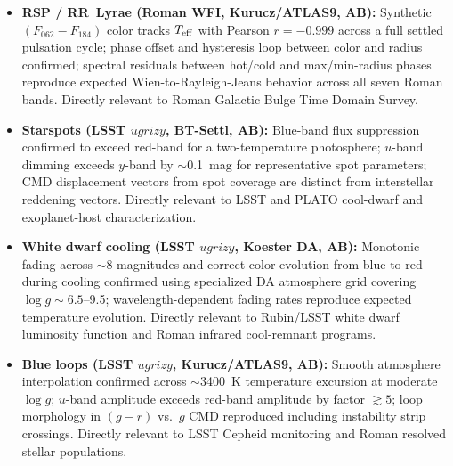 \documentclass[linenumbers,apj,twocolumn, floatfix]{aastex701}
\begin{document}
\begin{itemize}
    \item \textbf{RSP / RR~Lyrae (Roman WFI, Kurucz/ATLAS9, AB):} Synthetic $(F_{062}-F_{184})$ color tracks $T_{\rm eff}$ with Pearson $r = -0.999$ across a full settled pulsation cycle; phase offset and hysteresis loop between color and radius confirmed; spectral residuals between hot/cold and max/min-radius phases reproduce expected Wien-to-Rayleigh-Jeans behavior across all seven Roman bands. Directly relevant to Roman Galactic Bulge Time Domain Survey.
    \item \textbf{Starspots (LSST $ugrizy$, BT-Settl, AB):} Blue-band flux suppression confirmed to exceed red-band for a two-temperature photosphere; $u$-band dimming exceeds $y$-band by $\sim$0.1~mag for representative spot parameters; CMD displacement vectors from spot coverage are distinct from interstellar reddening vectors. Directly relevant to LSST and PLATO cool-dwarf and exoplanet-host characterization.
    \item \textbf{White dwarf cooling (LSST $ugrizy$, Koester DA, AB):} Monotonic fading across $\sim$8 magnitudes and correct color evolution from blue to red during cooling confirmed using specialized DA atmosphere grid covering $\log g \sim 6.5$--9.5; wavelength-dependent fading rates reproduce expected temperature evolution. Directly relevant to Rubin/LSST white dwarf luminosity function and Roman infrared cool-remnant programs.
    \item \textbf{Blue loops (LSST $ugrizy$, Kurucz/ATLAS9, AB):} Smooth atmosphere interpolation confirmed across $\sim$3400~K temperature excursion at moderate $\log g$; $u$-band amplitude exceeds red-band amplitude by factor $\gtrsim 5$; loop morphology in $(g-r)$ vs.\ $g$ CMD reproduced including instability strip crossings. Directly relevant to LSST Cepheid monitoring and Roman resolved stellar populations.
\end{itemize}
 
\end{document}
